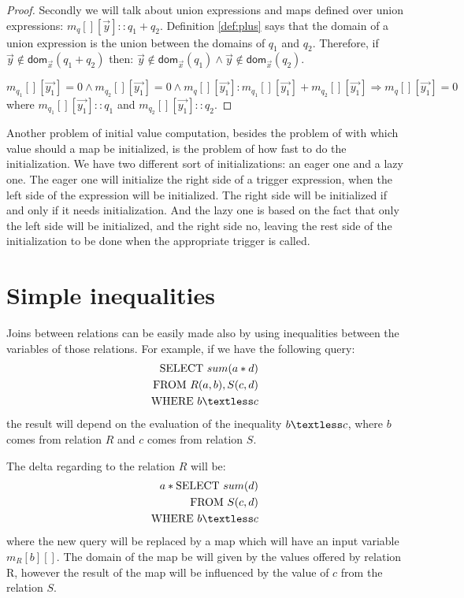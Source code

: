 \documentclass[12pt]{article}
\newcommand{\dom}{\textsf{dom}}
\begin{document}
\begin{proof}
Secondly we will talk about union expressions and maps defined over union expressions: $m_q[][\vec{y}]::q_1+q_2$. Definition \ref{def:plus} says that the domain of a union expression is the union between the domains of $q_1$ and $q_2$. Therefore, if $\vec{y}\notin\dom{}_{\vec{x}}(q_1+q_2)$ then: $\vec{y}\notin\dom{}_{\vec{x}}(q_1)\land \vec{y}\notin\dom{}_{\vec{x}}(q_2)$.

$$m_{q_1}[][\vec{y_1}]=0\land m_{q_2}[][\vec{y_1}]=0\land m_q[][\vec{y_1}]: m_{q_1}[][\vec{y_1}]+m_{q_2}[][\vec{y_1}]\Rightarrow m_q[][\vec{y_1}]=0$$
where $m_{q_1}[][\vec{y_1}]::q_1$ and $m_{q_2}[][\vec{y_1}]::q_2$.
\end{proof}

Another problem of initial value computation, besides the problem of with which value should a map be initialized, is the problem of how fast to do the initialization. We have two different sort of initializations: an eager one and a lazy one. The eager one will initialize the right side of a trigger expression, when the left side of the expression will be initialized. The right side will be initialized if and only if it needs initialization. And the lazy one is based on the fact that only the left side will be initialized, and the right side no, leaving the rest side of the initialization to be done when the appropriate trigger is called.

\section{Simple inequalities}

Joins between relations can be easily made also by using inequalities between the variables of those relations. For example, if we have the following query:
\begin{align*}
\mbox{SELECT }sum(a*d)\\
\mbox{FROM } R(a,b),S(c,d)\\
\mbox{WHERE } b\textless c 
\end{align*}
the result will depend on the evaluation of the inequality $b\textless c$, where $b$ comes from relation $R$ and $c$ comes from relation $S$.

The delta regarding to the relation $R$ will be: 
\begin{align*}
a*\mbox{SELECT }sum(d)\\
\mbox{FROM }S(c,d)\\
\mbox{WHERE } b\textless c 
\end{align*}
where the new query will be replaced by a map which will have an input variable $m_R[b][]$. The domain of the map be will given by the values offered by relation R, however the result of the map will be influenced by the value of $c$ from the relation $S$.
\end{document}
